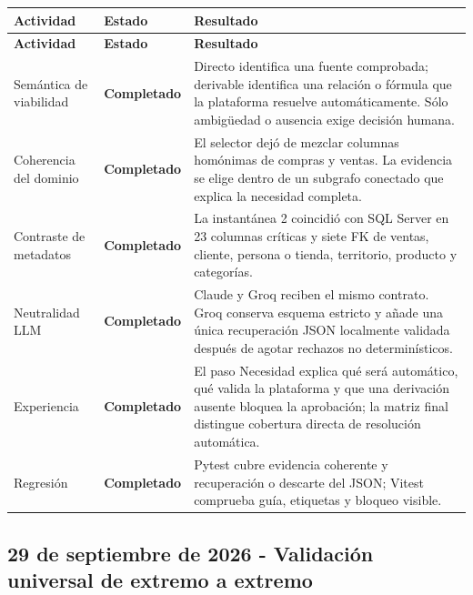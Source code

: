 \documentclass[11pt,letterpaper]{article}
\newcommand{\statusok}{\textcolor{deepgreen}{\textbf{Completado}}}
\begin{document}
\begin{longtable}{@{}p{}p{}p{}@{}}
  \toprule
  \textbf{Actividad} & \textbf{Estado} & \textbf{Resultado} \\
  \midrule
  \endfirsthead
  \toprule
  \textbf{Actividad} & \textbf{Estado} & \textbf{Resultado} \\
  \midrule
  \endhead
  Semántica de viabilidad & \statusok & Directo identifica una fuente comprobada; derivable identifica una relación o fórmula que la plataforma resuelve automáticamente. Sólo ambigüedad o ausencia exige decisión humana. \\
  Coherencia del dominio & \statusok & El selector dejó de mezclar columnas homónimas de compras y ventas. La evidencia se elige dentro de un subgrafo conectado que explica la necesidad completa. \\
  Contraste de metadatos & \statusok & La instantánea 2 coincidió con SQL Server en 23 columnas críticas y siete FK de ventas, cliente, persona o tienda, territorio, producto y categorías. \\
  Neutralidad LLM & \statusok & Claude y Groq reciben el mismo contrato. Groq conserva esquema estricto y añade una única recuperación JSON localmente validada después de agotar rechazos no determinísticos. \\
  Experiencia & \statusok & El paso Necesidad explica qué será automático, qué valida la plataforma y que una derivación ausente bloquea la aprobación; la matriz final distingue cobertura directa de resolución automática. \\
  Regresión & \statusok & Pytest cubre evidencia coherente y recuperación o descarte del JSON; Vitest comprueba guía, etiquetas y bloqueo visible. \\
  \bottomrule
\end{longtable}

\subsection{29 de septiembre de 2026 - Validación universal de extremo a extremo}
\end{document}
